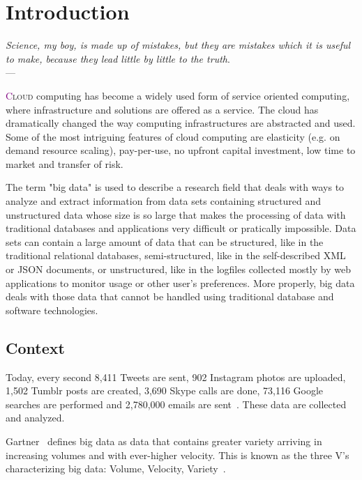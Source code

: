 \chapter{Introduction} \label{chap:Introduction}
\begin{flushright}{\slshape    
   Science, my boy, is made up of mistakes, but they are mistakes
   which it is useful to make, because they lead little by little
   to the truth}. \\ \medskip --- \citeauthor{verne_journey:1957}
    \citeyear{verne_journey:1957}
\end{flushright} 

\lettrine[lines=4]{\textcolor{purple}{C}}{loud} computing has become a widely used form of service oriented computing, where infrastructure and solutions are offered as a service. The cloud has dramatically changed the way computing infrastructures are abstracted and used. Some of the most intriguing features of cloud computing are elasticity (e.g. on demand resource scaling), pay-per-use, no upfront capital investment, low time to market and transfer of risk. 

The term "big data" is used to describe a research field that deals with ways to analyze and extract information from data sets containing structured and unstructured data whose size is so large that makes the processing of data with traditional databases and applications very difficult or pratically impossible. Data sets can contain a large amount of data that can be structured, like in the traditional relational databases, semi-structured, like in the self-described XML or JSON documents, or unstructured, like in the logfiles collected mostly by web applications to monitor usage or other user's preferences. More properly, big data deals with those data that cannot be handled using traditional database and software technologies. 

\section{Context}\label{sec:context}
Today, every second 8,411 Tweets are sent, 902 Instagram photos are uploaded, 1,502 Tumblr posts are created, 3,690 Skype calls are done, 73,116 Google searches are performed and 2,780,000 emails are sent~\cite{misc:InternetLiveStats}. These data are collected and analyzed. 

Gartner~\cite{Gartner} defines big data as data that contains greater variety arriving in increasing volumes and with ever-higher velocity. This is known as the three V's characterizing  big data: Volume, Velocity, Variety~\cite{WhatIsBigData}. 

